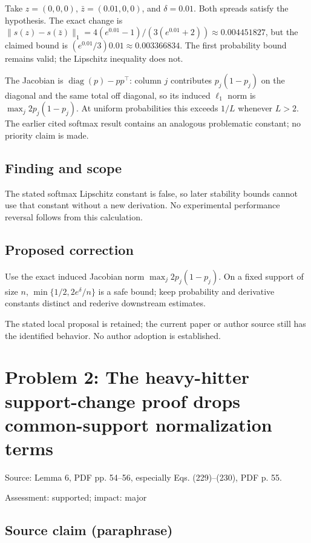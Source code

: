 \documentclass[11pt]{article}
\begin{document}
Take \(z=(0,0,0)\), \(\bar z=(0.01,0,0)\), and \(\delta=0.01\). Both spreads satisfy the hypothesis. The exact change is \(\|s(z)-s(\bar z)\|_1=4(e^{0.01}-1)/(3(e^{0.01}+2))\approx0.004451827\), but the claimed bound is \((e^{0.01}/3)0.01\approx0.003366834\). The first probability bound remains valid; the Lipschitz inequality does not.

The Jacobian is \(\operatorname{diag}(p)-pp^\top\): column \(j\) contributes \(p_j(1-p_j)\) on the diagonal and the same total off diagonal, so its induced \(\ell_1\) norm is \(\max_j2p_j(1-p_j)\). At uniform probabilities this exceeds \(1/L\) whenever \(L>2\). The earlier cited softmax result contains an analogous problematic constant; no priority claim is made.

\subsection*{Finding and scope}

The stated softmax Lipschitz constant is false, so later stability bounds cannot use that constant without a new derivation. No experimental performance reversal follows from this calculation.

\subsection*{Proposed correction}

Use the exact induced Jacobian norm \(\max_j2p_j(1-p_j)\). On a fixed support of size \(n\), \(\min\{1/2,2e^\delta/n\}\) is a safe bound; keep probability and derivative constants distinct and rederive downstream estimates.

The stated local proposal is retained; the current paper or author source still has the identified behavior. No author adoption is established.

\section*{Problem 2: The heavy-hitter support-change proof drops common-support normalization terms}

Source: Lemma 6, PDF pp. 54–56, especially Eqs. (229)–(230), PDF p. 55.

Assessment: supported; impact: major

\subsection*{Source claim (paraphrase)}
\end{document}
